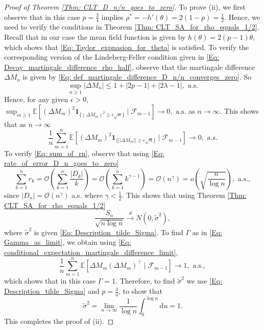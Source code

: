 \documentclass{article}
\numberwithin{equation}{section}
\newcommand{\FF}{\mbox{${\mathcal F}$}}
\newcommand{\OO}{\mbox{${\mathcal O}$}}
\newcommand{\1}{\mathbf{1}}
\newcommand{\0}{\mathbf{0}}
\newcommand{\E}{\mbox{${\mathbb E}$}}
\begin{document}
\begin{proof}[Proof of Theorem \ref{Thm: CLT_D_n/n_goes_to_zero}]
 To prove (ii), we first observe that in this case $p=\frac{3}{4}$ implies $\rho^*=-h'(\theta)= 2(1-p)= \frac{1}{2}$. Hence, we need to verify the conditions in Theorem \ref{Thm: CLT_SA_for_rho_equals_1/2}. Recall that in our case the mean field function is given by $h(\theta)= 2(p-1)\theta$, which shows that \eqref{Eq: Taylor_expnasion_for_theta} is satisfied. To verify the corresponding version of the Lindeberg-Feller condition given in \eqref{Eq: Decay_martingale_difference_rho_half}, observe that the martingale difference $\Delta M_n$ is given by \eqref{Eq: def_martingale_difference_D_n/n_converges_zero}. So 
\begin{equation}
\label{Eq: bound_on_martingale_difference}
\sup_{n \ge 1} \lvert \Delta M_n \rvert \le 1 +\lvert 2p-1 \rvert + \lvert 2 \lambda -1 \rvert, \text{ a.s.}
\end{equation}
Hence, for any given $\epsilon>0$, $\sup_{m \ge 1} \E\left[( \Delta M_m )^2 \mathbf{1}_{\{(\Delta M_m)^2 \ge \epsilon \sqrt{n}\}}\mid  \FF_{m-1}\right] \rightarrow 0, \text{ a.s.}$ as $n \to \infty$. This shows that as $n \to \infty$
\[
\frac{1}{n} \sum_{m=1}^n \E\left[(\Delta M_m) ^2 \mathbf{1}_{\{\lvert \lvert \Delta M_m\rvert \rvert \ge \epsilon \sqrt{n}\}}\mid  \FF_{m-1}\right]\rightarrow 0, \text{ a.s.}
\]
To verify \eqref{Eq: sum_of_rn}, observe that using \eqref{Eq: rate_of_error_D_n_goes_to_zero}
\[
\sum_{k=1}^n r_k= \OO (\sum_{k=1}^n\frac{\lvert D_k \rvert }{k})=\OO (\sum_{k=1}^n k^{\gamma-1})=\OO(n^{\gamma})=o\left(\sqrt{\frac{n}{\log n}}\right), \text{ a.s.}, 
\]
since $ \lvert D_n \rvert = \mathcal{O}(n^{\gamma})$ a.s. where $\gamma< \frac{1}{2}$. This shows that using Theorem \ref{Thm: CLT_SA_for_rho_equals_1/2} 
\[
\frac{S_n}{\sqrt{n \log n }}\stackrel{d}{\longrightarrow} N (0,\widetilde{\sigma}^2),
\]
where $\widetilde{\sigma}^2$ is given \eqref{Eq: Description_tilde_Sigma}.
To find $\Gamma$ as in \eqref{Eq: Gamma_as_limit}, we obtain using \eqref{Eq: conditional_expectation_martingale_difference_limit},
\[
\frac{1}{n} \sum_{m=1}^n \E \left[\Delta M_m \left(\Delta M_m\right)^\top \mid \FF_{m-1}\right]\rightarrow 1 , \text { a.s.}, 
\]
which shows that in this case $\Gamma=1$. Therefore, to find $\widetilde{\sigma}^2$ we use \eqref{Eq: Description_tilde_Sigma} and $p=\frac{3}{4}$,  to show that 
\[
\widetilde{\sigma}^2= \lim_{n \to \infty}\frac{1}{\log n}\int_{0}^{\log n} { \mathrm{d}u} =1.
\]
This completes the proof of (ii).



\end{proof}
\end{document}
